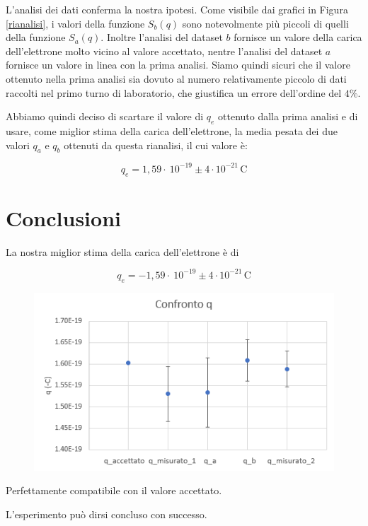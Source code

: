 \documentclass{article}
\begin{document}
L'analisi dei dati conferma la nostra ipotesi. Come visibile dai grafici in Figura \ref{rianalisi}, i valori della funzione $S_b(q)$ sono notevolmente più piccoli di quelli della funzione $S_a(q)$. Inoltre l'analisi del dataset $b$ fornisce un valore della carica dell'elettrone molto vicino al valore accettato, nentre l'analisi del dataset $a$ fornisce un valore in linea con la prima analisi. Siamo quindi sicuri che il valore ottenuto nella prima analisi sia dovuto al numero relativamente piccolo di dati raccolti nel primo turno di laboratorio, che giustifica un errore dell'ordine del $4\%$.

\vspace{5mm}

Abbiamo quindi deciso di scartare il valore di $q_e$ ottenuto dalla prima analisi e di usare, come miglior stima della carica dell'elettrone, la media pesata dei due valori $q_a$ e $q_b$ ottenuti da questa rianalisi, il cui valore è: 

\[q_e = 1,59 \cdot\ 10^{-19} \pm 4 \cdot 10^{-21} \, \textrm{C}\]

\pagebreak

\section{Conclusioni}

La nostra miglior stima della carica dell'elettrone è di 

\[q_e = - 1,59 \cdot\ 10^{-19} \pm 4 \cdot 10^{-21} \, \textrm{C}\]

\begin{figure}[h]
\centering
\includegraphics[width=0.7\linewidth]{Confronto_q_2}
\end{figure}

Perfettamente compatibile con il valore accettato.

\vspace{5mm}

L'esperimento può dirsi concluso con successo.
\end{document}
